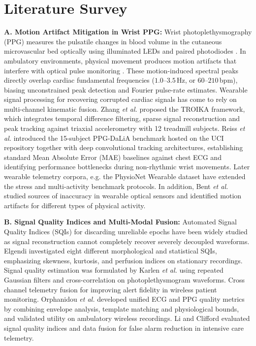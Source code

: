 \documentclass[conference]{IEEEtran}
\begin{document}
\section{Literature Survey}
\textbf{A. Motion Artifact Mitigation in Wrist PPG:} Wrist photoplethysmography (PPG) measures the pulsatile changes in blood volume in the cutaneous microvascular bed optically using illuminated LEDs and paired photodiodes \cite{ref_charlton_roadmap}. In ambulatory environments, physical movement produces motion artifacts that interfere with optical pulse monitoring \cite{ref_bent_sources}. These motion-induced spectral peaks directly overlap cardiac fundamental frequencies ($1.0\text{--}3.5$\,Hz, or $60\text{--}210$\,bpm), biasing unconstrained peak detection and Fourier pulse-rate estimates. Wearable signal processing for recovering corrupted cardiac signals has come to rely on multi-channel kinematic fusion. Zhang \emph{et al.} \cite{ref_zhang_troika} proposed the TROIKA framework, which integrates temporal difference filtering, sparse signal reconstruction and peak tracking against triaxial accelerometry with 12 treadmill subjects. Reiss \emph{et al.} \cite{ref_reiss_dalia} introduced the 15-subject PPG-DaLiA benchmark hosted on the UCI repository \cite{ref_uci_dalia} together with deep convolutional tracking architectures, establishing standard Mean Absolute Error (MAE) baselines against chest ECG and identifying performance bottlenecks during non-rhythmic wrist movements. Later wearable telemetry corpora, e.g. the PhysioNet Wearable dataset \cite{ref_physionet_wearable} have extended the stress and multi-activity benchmark protocols. In addition, Bent \emph{et al.} \cite{ref_bent_sources} studied sources of inaccuracy in wearable optical sensors and identified motion artifacts for different types of physical activity.

\textbf{B. Signal Quality Indices and Multi-Modal Fusion:} Automated Signal Quality Indices (SQIs) for discarding unreliable epochs have been widely studied \cite{ref_elgendi_sqi, ref_charlton_roadmap} as signal reconstruction cannot completely recover severely decoupled waveforms. Elgendi \cite{ref_elgendi_sqi} investigated eight different morphological and statistical SQIs, emphasizing skewness, kurtosis, and perfusion indices on stationary recordings. Signal quality estimation was formulated by Karlen \emph{et al.} \cite{ref_karlen_sqi} using repeated Gaussian filters and cross-correlation on photoplethysmogram waveforms. Cross channel telemetry fusion for improving alert fidelity in wireless patient monitoring. Orphanidou \emph{et al.} \cite{ref_orphanidou_sqi} developed unified ECG and PPG quality metrics by combining envelope analysis, template matching and physiological bounds, and validated utility on ambulatory wireless recordings. Li and Clifford \cite{ref_li_clifford_fusion} evaluated signal quality indices and data fusion for false alarm reduction in intensive care telemetry.
\end{document}
